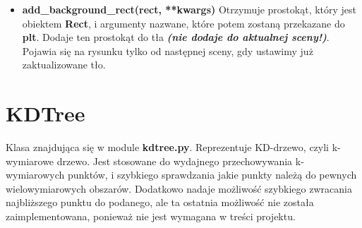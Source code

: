\documentclass[a4paper, 12pt]{article}
\begin{document}
\begin{itemize}
          \item \textbf{add\_background\_rect(rect, **kwargs)} \vspace{6pt}\newline
          \quad Otrzymuje prostokąt, który jest obiektem \textbf{Rect}, i argumenty nazwane, które potem zostaną przekazane do \textbf{plt}. Dodaje ten prostokąt do tła \textbf{\textit{(nie dodaje do aktualnej sceny!)}}. Pojawia się na rysunku tylko od następnej sceny, gdy ustawimy już zaktualizowane tło.
          \vspace{6pt}
      \end{itemize}


  \section{KDTree}
    \quad Klasa znajdująca się w module \textbf{kdtree.py}. Reprezentuje KD-drzewo, czyli k-wymiarowe drzewo. Jest stosowane do wydajnego przechowywania k-wymiarowych punktów, i szybkiego sprawdzania jakie punkty należą do pewnych wielowymiarowych obszarów. Dodatkowo nadaje możliwość szybkiego zwracania najbliższego punktu do podanego, ale ta ostatnia możliwość nie została zaimplementowana, ponieważ nie jest wymagana w treści projektu.
\end{document}
